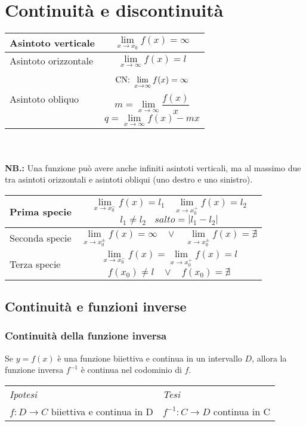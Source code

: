 \documentclass{book}     %
\begin{document}
\section{Continuità e discontinuità}
\begin{tabular}{|m{}|m{}|}
        \hline
        Asintoto verticale&  \[\lim_{x\rightarrow x_0} f(x) = \infty\] \\\hline
        Asintoto orizzontale & \[\lim_{x\rightarrow \infty} f(x) = l\]\\ \hline
        Asintoto obliquo & \[\textnormal{CN: }\lim_{x\rightarrow\infty}f(x) = \infty\]
        \[m=\lim_{x\rightarrow\infty}\frac{f(x)}{x}\]
        \[q=\lim_{x\rightarrow\infty}f(x)-mx\] \\ \hline
    \end{tabular}\\
    \\
    \textbf{NB.:} Una funzione può avere anche infiniti asintoti verticali, ma al massimo due tra asintoti orizzontali e asintoti obliqui (uno destro e uno sinistro).\\    \begin{tabular}{|m{}|m{}|}
        \hline
        Prima specie &  \[\lim_{x\rightarrow x_0^-}f(x)=l_1~~~~\lim_{x\rightarrow x_0^+}f(x)=l_2\] \[l_1\neq l_2~~~~salto=|l_1-l_2|\]\\ \hline
        Seconda specie &  \[\lim_{x\rightarrow x_0^\pm}f(x)=\infty ~~~~\lor~~~~ \lim_{x\rightarrow x_0^\pm}f(x)=\nexists\] \\\hline
        Terza specie & \[\lim_{x\rightarrow x_0^-}f(x)=\lim_{x\rightarrow x_0^+}f(x)=l\]\[f(x_0)\neq l ~~~~ \lor ~~~~ f(x_0)=\nexists\]\\ \hline
    \end{tabular}
\subsection{Continuità e funzioni inverse}
    \subsubsection{Continuità della funzione inversa}
        \begin{shadedTheorem}
            Se $y=f(x)$ è una funzione biiettiva e continua in un intervallo $D$, allora la funzione inversa $f^{-1}$ è continua nel codominio di $f$.
        \end{shadedTheorem}
        \begin{tabular}{m{}m{}}
            \textit{Ipotesi} & \textit{Tesi}  \\
            $f:D\to C$ biiettiva e continua in D & $f^{-1}:C\to D$ continua in C 
        \end{tabular}
        
\end{document}
